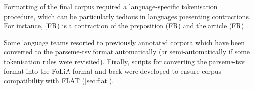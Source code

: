 \documentclass[output=paper,
modfonts,
]{langscibook}
\begin{document}
Formatting of the final corpus required a language-specific tokenisation procedure, which can be particularly tedious in languages presenting contractions. For instance, %
(FR)  is a contraction of the preposition (FR)  and the article (FR) . 

Some language teams resorted to previously annotated corpora %
which have been converted to the parseme-tsv format automatically (or semi-automatically if some tokenisation rules were revisited). 
Finally, scripts for converting the parseme-tsv format into the FoLiA format and back were developed to ensure corpus compatibility with FLAT (\ref{sec:flat}).


\end{document}
